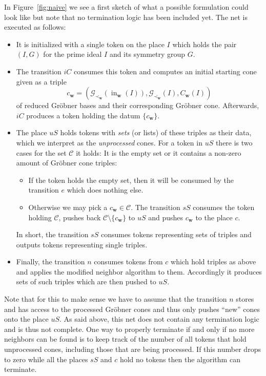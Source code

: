 \documentclass[
  paper=a4,
  titlepage,
  bibliography=totoc,
  pagesize=pdftex
]{scrartcl}
\numberwithin{figure}{section}
\numberwithin{equation}{section}
\numberwithin{table}{section}
\let\vec\mathbf
\DeclareMathOperator{\initial}{in}
\theoremstyle{definition}
\numberwithin{definition}{section}
\begin{document}
In Figure~\ref{fig:naive} we see a first sketch of what a possible formulation could look
like but note that no termination logic has been included yet. The net is executed as
follows:
\begin{itemize}
  \item It is initialized with a single token on the place $I$ which holds the pair $(I,
    G)$ for the prime ideal $I$ and its symmetry group $G$.
  \item The transition $iC$ consumes this token and computes an initial starting cone
    given as a triple
    \[
      c_{\vec w} = (
        \mathcal G_{\prec_{\vec w}}(\initial_{\vec w}(I)),
        \mathcal G_{\prec_{\vec w}}(I),
        C_{\vec w}(I)
      )
    \]
    of reduced Gröbner bases and their corresponding Gröbner cone. Afterwards, $iC$
    produces a token holding the datum $\{c_{\vec w}\}$.
  \item The place $uS$ holds tokens with \emph{sets} (or lists) of these triples as their
    data, which we interpret as the \emph{unprocessed} cones. For a token in $uS$ there is
    two cases for the set $\mathcal C$ it holds: It is the empty set or it contains a
    non-zero amount of Gröbner cone triples:
    \begin{itemize}
      \item If the token holds the empty set, then it will be consumed by the transition
        $e$ which does nothing else.
      \item Otherwise we may pick a $c_{\vec w} \in \mathcal C$. The transition $sS$
        consumes the token holding $\mathcal C$, pushes back $\mathcal C\setminus \{
        c_{\vec w}\}$ to $uS$ and pushes $c_{\vec w}$ to the place $c$.
    \end{itemize}
    In short, the transition $sS$ consumes tokens representing sets of triples and outputs
    tokens representing single triples.
  \item Finally, the transition $n$ consumes tokens from $c$ which hold triples as above
    and applies the modified neighbor algorithm to them. Accordingly it produces sets of
    such triples which are then pushed to $uS$.
\end{itemize}
Note that for this to make sense we have to assume that the transition $n$ stores and has
access to the processed Gröbner cones and thus only pushes \enquote{new} cones onto the
place $uS$. As said above, this net does not contain any termination logic and is thus not
complete. One way to properly terminate if and only if no more neighbors can be found is
to keep track of the number of all tokens that hold unprocessed cones, including those
that are being processed. If this number drops to zero while all the places $sS$ and $c$
hold no tokens then the algorithm can terminate.
\end{document}
